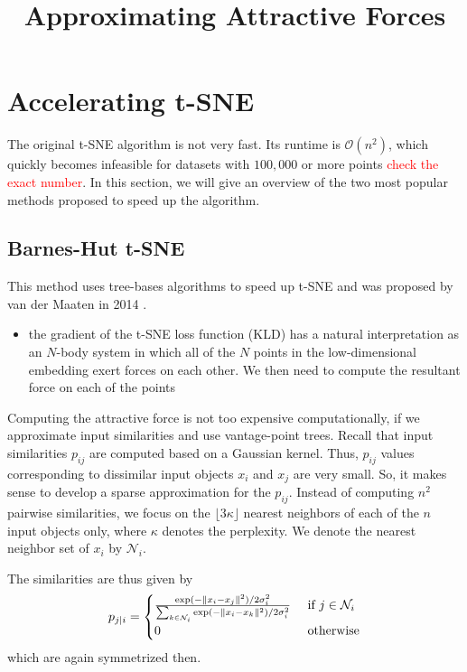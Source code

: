 \section{Accelerating t-SNE}

The original t-SNE algorithm is not very fast. Its runtime is $\mathcal{O}(n^2)$, which quickly becomes infeasible for datasets with $100,000$ or more points \textcolor{red}{check the exact number}. In this section, we will give an overview of the two most popular methods proposed to speed up the algorithm. 

\subsection{Barnes-Hut t-SNE}
This method uses tree-bases algorithms to speed up t-SNE and was proposed by van der Maaten in 2014 \cite{vdMaa14}. 

\begin{itemize}
    \item the gradient of the t-SNE loss function (KLD) has a natural interpretation as an $N$-body system in which all of the $N$ points in the low-dimensional embedding exert forces on each other. We then need to compute the resultant force on each of the points
\end{itemize}

\title{Approximating Attractive Forces}
Computing the attractive force is not too expensive computationally, if we approximate input similarities and use vantage-point trees. Recall that input similarities $p_{ij}$ are computed based on a Gaussian kernel. 
Thus, $p_{ij}$ values corresponding to dissimilar input objects $x_i$ and $x_j$ are very small. 
So, it makes sense to develop a sparse approximation for the $p_{ij}$. Instead of computing $n^2$ pairwise similarities, we focus on the $\lfloor 3 \kappa \rfloor$ nearest neighbors of each of the $n$ input objects only, where $\kappa$ denotes the perplexity. We denote the nearest neighbor set of $x_i$ by $\mathcal{N}_i$. 

The similarities are thus given by 
\begin{equation}
    p_{j|i} = \begin{cases}
    \frac{\exp(-\lVert x_i - x_j\rVert^2) / 2 \sigma_i^2}{\sum_{k \in \mathcal{N}_i} \exp(-\lVert x_i - x_k\rVert^2) / 2 \sigma_i^2} & \text{ if } j \in \mathcal{N}_i \\
    0  & \text{ otherwise}
    \end{cases}
\end{equation}
which are again symmetrized then. 

